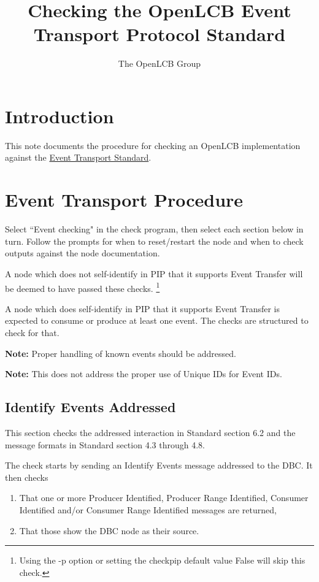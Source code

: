 \documentclass[11pt]{article}
\title{Checking the OpenLCB Event Transport Protocol Standard}
\author{The OpenLCB Group}
\begin{document}
\maketitle


\section{Introduction}

This note documents the procedure for checking an OpenLCB implementation against the 
\href{https://nbviewer.org/github/openlcb/documents/blob/master/standards/EventTransportS.pdf}{Event Transport Standard}.



\section{Event Transport Procedure}

Select ``Event checking" in the check program, 
then select each section below in turn.  Follow the prompts
for when to reset/restart the node and when to check 
outputs against the node documentation.

A node which does not self-identify in PIP that it supports
Event Transfer will be deemed to have passed these checks.
\footnote{Using the -p option or setting the checkpip default value False will skip this check.}

A node which does self-identify in PIP that it supports 
Event Transfer is expected to consume or produce at least 
one event.  The checks are structured to check for that.

\textbf{Note:}  Proper handling of known events should be addressed.

\textbf{Note:}  This does not address the proper use of Unique IDs for Event IDs.

\subsection{Identify Events Addressed}

This section checks the addressed interaction in Standard section 6.2 and
the message formats in Standard section 4.3 through 4.8.

The check starts by sending an Identify Events message addressed to the DBC.
It then checks

\begin{enumerate}
\item That one or more Producer Identified, Producer Range Identified, 
        Consumer Identified and/or Consumer Range Identified messages are returned,
\item That those show the DBC node as their source.
\end{enumerate}
\end{document}
